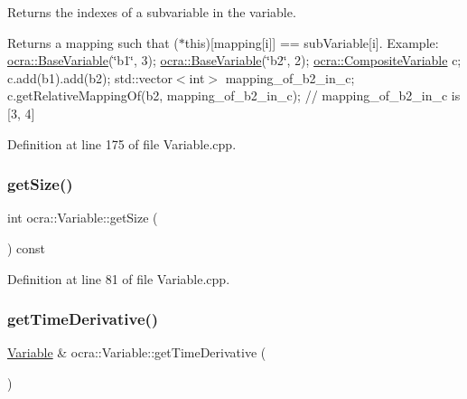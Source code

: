Returns the indexes of a subvariable in the variable. 

Returns a mapping such that ($\ast$this)\mbox{[}mapping\mbox{[}i\mbox{]}\mbox{]} == sub\+Variable\mbox{[}i\mbox{]}. Example\+:  \hyperlink{classocra_1_1BaseVariable}{ocra\+::\+Base\+Variable}(\char`\"{}b1\char`\"{}, 3); \hyperlink{classocra_1_1BaseVariable}{ocra\+::\+Base\+Variable}(\char`\"{}b2\char`\"{}, 2); \hyperlink{classocra_1_1CompositeVariable}{ocra\+::\+Composite\+Variable} c; c.\+add(b1).add(b2); std\+::vector$<$int$>$ mapping\+\_\+of\+\_\+b2\+\_\+in\+\_\+c; c.\+get\+Relative\+Mapping\+Of(b2, mapping\+\_\+of\+\_\+b2\+\_\+in\+\_\+c); // mapping\+\_\+of\+\_\+b2\+\_\+in\+\_\+c is \mbox{[}3, 4\mbox{]}  

Definition at line 175 of file Variable.\+cpp.

\hypertarget{classocra_1_1Variable_af3473076b7861a5a78c8a246323af9f0}{}\label{classocra_1_1Variable_af3473076b7861a5a78c8a246323af9f0} 
\subsubsection{\texorpdfstring{get\+Size()}{getSize()}}
{\footnotesize\ttfamily int ocra\+::\+Variable\+::get\+Size (\begin{DoxyParamCaption}{ }\end{DoxyParamCaption}) const}



Definition at line 81 of file Variable.\+cpp.

\hypertarget{classocra_1_1Variable_a06ee384364d5c6bd1ea4bc4b38d6268c}{}\label{classocra_1_1Variable_a06ee384364d5c6bd1ea4bc4b38d6268c} 
\subsubsection{\texorpdfstring{get\+Time\+Derivative()}{getTimeDerivative()}}
{\footnotesize\ttfamily \hyperlink{classocra_1_1Variable}{Variable} \& ocra\+::\+Variable\+::get\+Time\+Derivative (\begin{DoxyParamCaption}{ }\end{DoxyParamCaption})\hspace{0.3cm}{\ttfamily [virtual]}}



